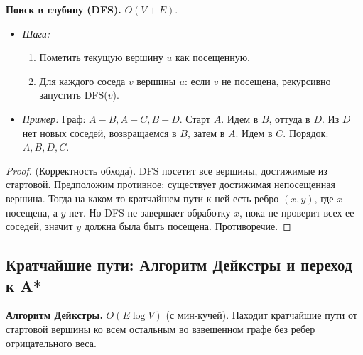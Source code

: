 \documentclass[12pt, a4paper]{article}
\begin{document}
\textbf{Поиск в глубину (DFS).} $O(V + E)$.
\begin{itemize}
    \item \textit{Шаги:}
    \begin{enumerate}
        \item Пометить текущую вершину $u$ как посещенную.
        \item Для каждого соседа $v$ вершины $u$: если $v$ не посещена, рекурсивно запустить DFS($v$).
    \end{enumerate}
    \item \textit{Пример:} Граф: $A-B, A-C, B-D$. Старт $A$. Идем в $B$, оттуда в $D$. Из $D$ нет новых соседей, возвращаемся в $B$, затем в $A$. Идем в $C$. Порядок: $A, B, D, C$.
\end{itemize}
\begin{proof}
(Корректность обхода). DFS посетит все вершины, достижимые из стартовой. Предположим противное: существует достижимая непосещенная вершина. Тогда на каком-то кратчайшем пути к ней есть ребро $(x, y)$, где $x$ посещена, а $y$ нет. Но DFS не завершает обработку $x$, пока не проверит всех ее соседей, значит $y$ должна была быть посещена. Противоречие.
\end{proof}

\subsection{Кратчайшие пути: Алгоритм Дейкстры и переход к A*}

\textbf{Алгоритм Дейкстры.} $O(E \log V)$ (с мин-кучей).
Находит кратчайшие пути от стартовой вершины ко всем остальным во взвешенном графе без ребер отрицательного веса.
\end{document}
